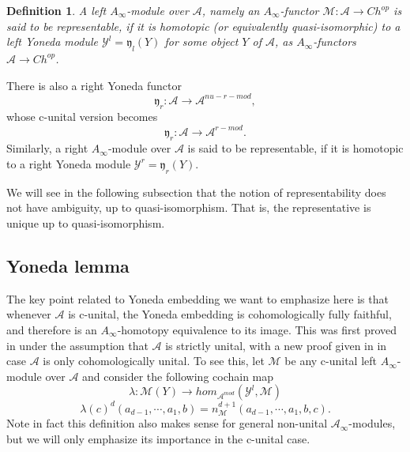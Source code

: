 \documentclass{amsart}
\newtheorem{definition}[theorem]{Definition}
\numberwithin{equation}{section}
\numberwithin{figure}{section}
\begin{document}
\begin{definition}
	A left $A_{\infty}$-module over $\mathcal{A}$, namely an $A_{\infty}$-functor $\mathcal{M}: \mathcal{A} \to Ch^{op}$ is said to be representable, if it is homotopic (or equivalently quasi-isomorphic) to a left Yoneda module $\mathcal{Y}^{l} = \mathfrak{y}_{l}(Y)$ for some object $Y$ of $\mathcal{A}$, as $A_{\infty}$-functors $\mathcal{A} \to Ch^{op}$.
\end{definition}

	There is also a right Yoneda functor
\begin{equation}
\mathfrak{y}_{r}: \mathcal{A} \to \mathcal{A}^{nu-r-mod},
\end{equation}
whose c-unital version becomes
\begin{equation}
\mathfrak{y}_{r}: \mathcal{A} \to \mathcal{A}^{r-mod}.
\end{equation}
Similarly, a right $A_{\infty}$-module over $\mathcal{A}$ is said to be representable, if it is homotopic to a right Yoneda module $\mathcal{Y}^{r} = \mathfrak{y}_{r}(Y)$. \par
	We will see in the following subsection that the notion of representability does not have ambiguity, up to quasi-isomorphism. That is, the representative is unique up to quasi-isomorphism. \par


\subsection{Yoneda lemma}
	The key point related to Yoneda embedding we want to emphasize here is that whenever $\mathcal{A}$ is c-unital, the Yoneda embedding is cohomologically fully faithful, and therefore is an $A_{\infty}$-homotopy equivalence to its image. This was first proved in \cite{Fukaya1} under the assumption that $\mathcal{A}$ is strictly unital, with a new proof given in \cite{Seidel} in case $\mathcal{A}$ is only cohomologically unital. To see this, let $\mathcal{M}$ be any c-unital left $A_{\infty}$-module over $\mathcal{A}$ and consider the following cochain map
\begin{equation}
\lambda: \mathcal{M}(Y) \to hom_{\mathcal{A}^{mod}}(\mathcal{Y}^{l}, \mathcal{M})
\end{equation}
\begin{equation}
\lambda(c)^{d}(a_{d-1}, \cdots, a_{1}, b) = n_{\mathcal{M}}^{d+1}(a_{d-1}, \cdots, a_{1}, b, c).
\end{equation}
Note in fact this definition also makes sense for general non-unital $\mathcal{A}_{\infty}$-modules, but we will only emphasize its importance in the c-unital case. \par
\end{document}
